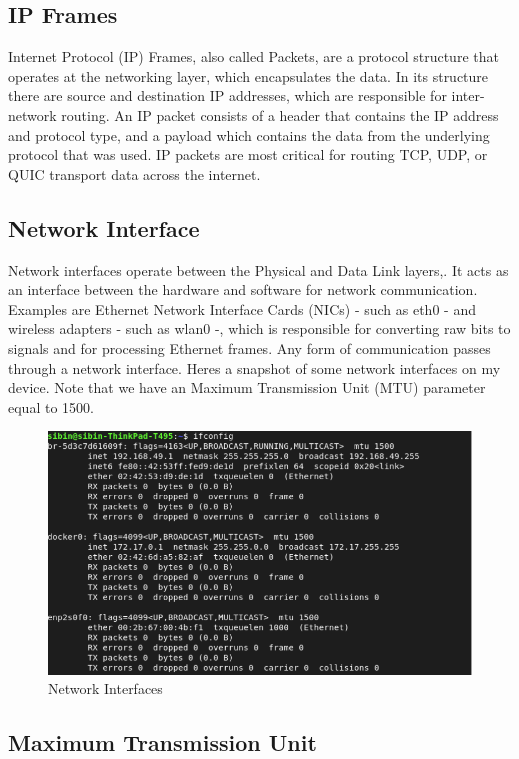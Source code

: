 \subsection{IP Frames}
Internet Protocol (IP) Frames, also called Packets, are a protocol structure that operates at the networking layer, which encapsulates the data. In its structure there are source and destination IP addresses, which are responsible for inter-network routing. An IP packet consists of a header that contains the IP address and protocol type, and a payload which contains the data from the underlying protocol that was used. IP packets are most critical for routing TCP, UDP, or QUIC transport data across the internet.

\subsection{Network Interface}
Network interfaces operate between the Physical and Data Link layers,. It acts as an interface between the hardware and software for network communication. Examples are Ethernet Network Interface Cards (NICs) - such as eth0 - and wireless adapters - such as wlan0 -, which is responsible for converting raw bits to signals and for processing Ethernet frames. Any form of communication passes through a network interface. Heres a snapshot of some network interfaces on my device.
Note that we have an Maximum Transmission Unit (MTU) parameter equal to 1500.

\begin{figure}[h]
\caption{Network Interfaces}
\centering
\includegraphics[width=1\textwidth]{SOA/NIC.png}
\end{figure}

\subsection{Maximum Transmission Unit}

